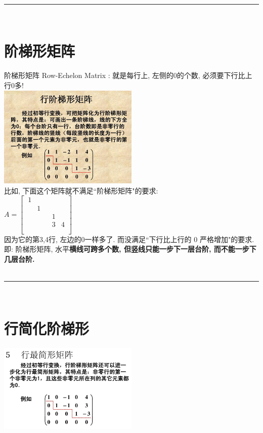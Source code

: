 \documentclass[UTF8]{ctexart}
\begin{document}
{~\\
\hrule
~\\

\section{阶梯形矩阵}

阶梯形矩阵 Row-Echelon Matrix : 就是每行上, 左侧的0的个数, 必须要下行比上行0多!\\

\includegraphics[width=0.5\textwidth]{img/0063.jpg}\\


比如, 下面这个矩阵就不满足``阶梯形矩阵"的要求:  \\
$A=\left[ \begin{matrix}\
	1&		&		&		&		\\
	&		1&		&		&		\\
	&		&		&		1&		\\
	&		&		&		3&		4\\
	&		&		&		&		\\
\end{matrix} \right]$\\

因为它的第3,4行, 左边的0一样多了. 而没满足``下行比上行的 0 严格增加"的要求.\\
即: 阶梯形矩阵, 水平\textbf{横线可跨多个数, 但竖线只能一步下一层台阶, 而不能一步下几层台阶.} \\


~\\
\hrule
~\\


\section{行简化阶梯形}

\includegraphics[width=0.5\textwidth]{img/0064.png}\\

}
\end{document}
